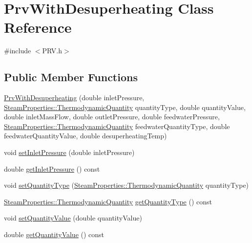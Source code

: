 \hypertarget{class_prv_with_desuperheating}{}\section{Prv\+With\+Desuperheating Class Reference}
\label{class_prv_with_desuperheating}


{\ttfamily \#include $<$P\+R\+V.\+h$>$}

\subsection*{Public Member Functions}
\begin{DoxyCompactItemize}
\item 
\hyperlink{class_prv_with_desuperheating_adfd7f6866e8b953dcc41e51bb5b31b58}{Prv\+With\+Desuperheating} (double inlet\+Pressure, \hyperlink{class_steam_properties_ae0294bedf7d178c2d8fb6aed0f62fbff}{Steam\+Properties\+::\+Thermodynamic\+Quantity} quantity\+Type, double quantity\+Value, double inlet\+Mass\+Flow, double outlet\+Pressure, double feedwater\+Pressure, \hyperlink{class_steam_properties_ae0294bedf7d178c2d8fb6aed0f62fbff}{Steam\+Properties\+::\+Thermodynamic\+Quantity} feedwater\+Quantity\+Type, double feedwater\+Quantity\+Value, double desuperheating\+Temp)
\item 
void \hyperlink{class_prv_with_desuperheating_a83da43f7557db22242381e70f743fb7a}{set\+Inlet\+Pressure} (double inlet\+Pressure)
\item 
double \hyperlink{class_prv_with_desuperheating_adca1724bc5afbe24b4e6c1a057dad111}{get\+Inlet\+Pressure} () const
\item 
void \hyperlink{class_prv_with_desuperheating_aed049483cd58d41501ce1461ad251230}{set\+Quantity\+Type} (\hyperlink{class_steam_properties_ae0294bedf7d178c2d8fb6aed0f62fbff}{Steam\+Properties\+::\+Thermodynamic\+Quantity} quantity\+Type)
\item 
\hyperlink{class_steam_properties_ae0294bedf7d178c2d8fb6aed0f62fbff}{Steam\+Properties\+::\+Thermodynamic\+Quantity} \hyperlink{class_prv_with_desuperheating_acf4609b0d63c60ccad298b8a17533ba6}{get\+Quantity\+Type} () const
\item 
void \hyperlink{class_prv_with_desuperheating_a9960e4be45699f09e65035832fff792a}{set\+Quantity\+Value} (double quantity\+Value)
\item 
double \hyperlink{class_prv_with_desuperheating_a6a2c13b37e09ae4eddbbb5dae7801b0e}{get\+Quantity\+Value} () const
\item 

\end{DoxyCompactItemize}
